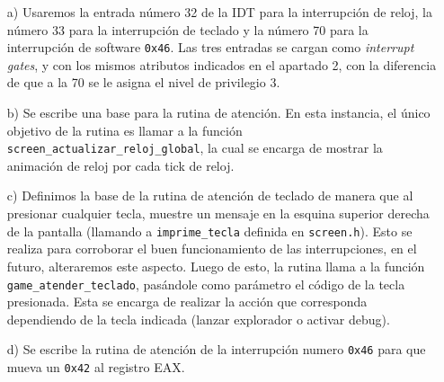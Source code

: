 \begin{enumerate}
\item[a)]Usaremos la entrada número 32 de la IDT para la interrupción de reloj, la número 33 para la interrupción de teclado y la número 70 para la interrupción de software {\tt 0x46}.  Las tres entradas se cargan como {\it interrupt gates}, y con los mismos atributos indicados en el apartado 2, con la diferencia de que a la 70 se le asigna el nivel de privilegio 3.

\item[b)]Se escribe una base para la rutina de atención. En esta instancia, el único objetivo de la rutina es llamar a la función {\tt screen_actualizar_reloj_global}, la cual se encarga de mostrar la animación de reloj por cada tick de reloj.

\item[c)]Definimos la base de la rutina de atención de teclado de manera que al presionar cualquier tecla, muestre un mensaje en la esquina superior derecha de la pantalla (llamando a {\tt imprime_tecla} definida en {\tt screen.h}). Esto se realiza para corroborar el buen funcionamiento de las interrupciones, en el futuro, alteraremos este aspecto. Luego de esto, la rutina llama a la función {\tt game_atender_teclado}, pasándole como parámetro el código de la tecla presionada. Esta se encarga de realizar la acción que corresponda dependiendo de la tecla indicada (lanzar explorador o activar debug).

\item[d)]Se escribe la rutina de atención de la interrupción numero {\tt 0x46} para que mueva un {\tt 0x42} al registro EAX.

\end{enumerate}
